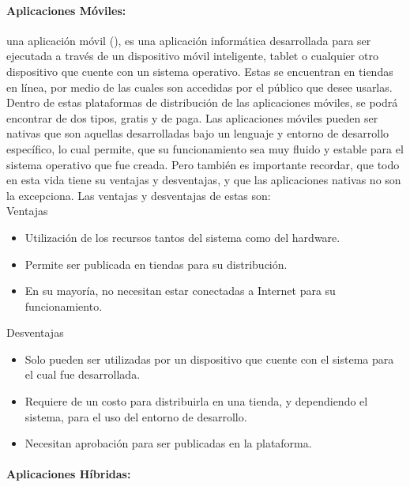 \paragraph{Aplicaciones Móviles:}

una aplicación móvil (\cite{MT-11}), es una aplicación informática desarrollada para ser ejecutada a través de un dispositivo móvil inteligente, tablet o cualquier otro dispositivo que cuente con un sistema operativo. Estas se encuentran en tiendas en línea, por medio de las cuales son accedidas por el público que desee usarlas.\\

Dentro de estas plataformas de distribución de las aplicaciones móviles, se podrá encontrar de dos tipos, gratis y de paga. Las aplicaciones móviles pueden ser nativas que son aquellas desarrolladas bajo un lenguaje y entorno de desarrollo específico, lo cual permite, que su funcionamiento sea muy fluido y estable para el sistema operativo que fue creada. Pero también es importante recordar, que todo en esta vida tiene su ventajas y desventajas, y que las aplicaciones nativas no son la excepciona. Las ventajas y desventajas de estas son:\\

Ventajas
\begin{itemize}
\item  Utilización de los recursos tantos del sistema como del hardware.
\item  Permite ser publicada en tiendas para su distribución.
\item  En su mayoría, no necesitan estar conectadas a Internet para su funcionamiento.
\end{itemize}

Desventajas
\begin{itemize}
\item  Solo pueden ser utilizadas por un dispositivo que cuente con el sistema para el cual fue desarrollada.
\item  Requiere de un costo para distribuirla en una tienda, y dependiendo el sistema, para el uso del entorno de desarrollo.
\item  Necesitan aprobación para ser publicadas en la plataforma.
\end{itemize}

\paragraph{Aplicaciones Híbridas:}

